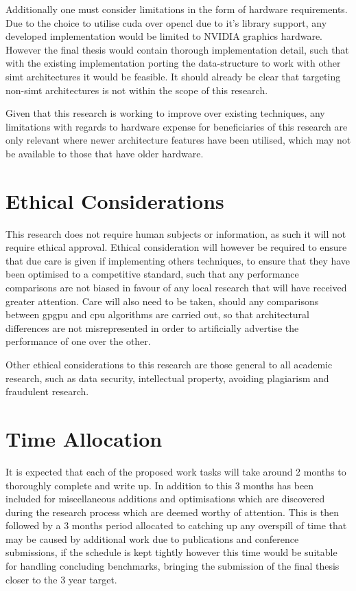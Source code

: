     Additionally one must consider limitations in the form of hardware requirements. Due to the choice to utilise \gls{cuda} over \gls{opencl} due to it's library support, any developed implementation would be limited to NVIDIA graphics hardware. However the final thesis would contain thorough implementation detail, such that with the existing implementation porting the data-structure to work with other \gls{simt} architectures it would be feasible. It should already be clear that targeting non-\gls{simt} architectures is not within the scope of this research.
    
    Given that this research is working to improve over existing techniques, any limitations with regards to hardware expense for beneficiaries of this research are only relevant where newer architecture features have been utilised, which may not be available to those that have older hardware.
  \section{Ethical Considerations}
    This research does not require human subjects or information, as such it will not require ethical approval. Ethical consideration will however be required to ensure that due care is given if implementing others techniques, to ensure that they have been optimised to a competitive standard, such that any performance comparisons are not biased in favour of any local research that will have received greater attention. Care will also need to be taken, should any comparisons between \gls{gpgpu} and \gls{cpu} algorithms are carried out, so that architectural differences are not misrepresented in order to artificially advertise the performance of one over the other.
    
    Other ethical considerations to this research are those general to all academic research, such as data security, intellectual property, avoiding plagiarism and fraudulent research.
  \section{Time Allocation}
    It is expected that each of the proposed work tasks will take around 2 months to thoroughly complete and write up. In addition to this 3 months has been included for miscellaneous additions and optimisations which are discovered during the research process which are deemed worthy of attention. This is then followed by a 3 months period allocated to catching up any overspill of time that may be caused by additional work due to publications and conference submissions, if the schedule is kept tightly however this time would be suitable for handling concluding benchmarks, bringing the submission of the final thesis closer to the 3 year target.
    
